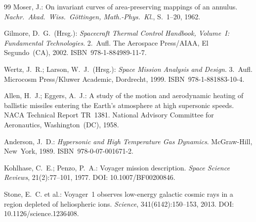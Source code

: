 ﻿\documentclass[a4paper,12pt,twoside]{article}
\theoremstyle{plain}
\theoremstyle{definition}
\theoremstyle{remark}
\begin{document}
\begin{thebibliography}{99}
	Moser, J.:
	On invariant curves of area-preserving mappings of an annulus.
	\textit{Nachr.\ Akad.\ Wiss.\ Göttingen, Math.-Phys.\ Kl.},
	S.~1--20, 1962.

	Gilmore, D.~G.\ (Hrsg.):
	\textit{Spacecraft Thermal Control Handbook, Volume~I:
	Fundamental Technologies}.
	2.~Aufl. The Aerospace Press/AIAA, El Segundo~(CA), 2002.
	ISBN~978-1-884989-11-7.

	Wertz, J.~R.; Larson, W.~J.\ (Hrsg.):
	\textit{Space Mission Analysis and Design}.
	3.~Aufl. Microcosm Press/Kluwer Academic, Dordrecht, 1999.
	ISBN~978-1-881883-10-4.

	Allen, H.~J.; Eggers, A.~J.:
	A study of the motion and aerodynamic heating of ballistic missiles
	entering the Earth's atmosphere at high supersonic speeds.
	NACA Technical Report TR~1381.
	National Advisory Committee for Aeronautics, Washington~(DC), 1958.

	Anderson, J.~D.:
	\textit{Hypersonic and High Temperature Gas Dynamics}.
	McGraw-Hill, New~York, 1989.
	ISBN~978-0-07-001671-2.

	Kohlhase, C.~E.; Penzo, P.~A.:
	Voyager mission description.
	\textit{Space Science Reviews}, 21(2):77--101, 1977.
	DOI: 10.1007/BF00200846.

	Stone, E.~C. et al.:
	Voyager~1 observes low-energy galactic cosmic rays in a region depleted of
	heliospheric ions.
	\textit{Science}, 341(6142):150--153, 2013.
	DOI: 10.1126/science.1236408.

	\end{thebibliography}
\end{document}
